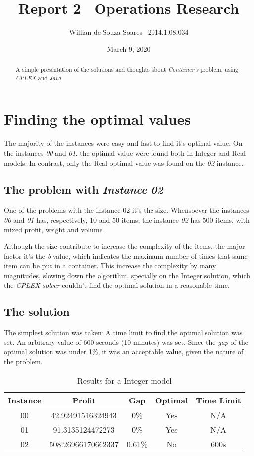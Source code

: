\documentclass[a4paper,10pt]{article}
\title{Report 2 \textendash\ Operations Research}
\author{Willian de Souza Soares \textendash\ 2014.1.08.034}
\date{March 9, 2020}
\begin{document}
\maketitle

\begin{abstract}
A simple presentation of the solutions and thoughts about \emph{Container's} problem, using \emph{CPLEX} and \emph{Java}.
\end{abstract}

\section{Finding the optimal values}
The majority of the instances were easy and fast to find it's optimal value. On the instances \emph{00} and \emph{01}, the optimal value were found both in Integer and Real models. In contrast, only the Real optimal value was found on the \emph{02} instance. 

\subsection{The problem with \emph{Instance 02}}

One of the problems with the instance 02 it's the size. Whensoever the instances \emph{00} and \emph{01} has, respectively, 10 and 50 items, the instance \emph{02} has 500 items, with mixed profit, weight and volume. 

Although the size contribute to increase the complexity of the items, the major factor it's the \emph{b} value, which indicates the maximum number of times that same item can be put in a container. This increase the complexity by many magnitudes, slowing down the algorithm, specially on the Integer solution, which the \emph{CPLEX solver} couldn't find the optimal solution in a reasonable time.

\subsection{The solution}

The simplest solution was taken: A time limit to find the optimal solution was set. An arbitrary value of 600 seconds (10 minutes) was set. Since the \emph{gap} of the optimal solution was under 1\%, it was an acceptable value, given the nature of the problem.

\begin{table}[h]
\caption{Results for a Integer model}
\centering
\label{tab:my-table}
\begin{tabular}{ccccc}
\hline
Instance & Profit             & Gap    & Optimal & Time Limit \\ \hline
00       & 42.92491516324943  & 0\%    & Yes     & N/A       \\
01       & 91.3135124472273   & 0\%    & Yes     & N/A       \\
02       & 508.26966170662337 & 0.61\% & No      & 600s      \\ \hline
\end{tabular}
\end{table}
\end{document}
